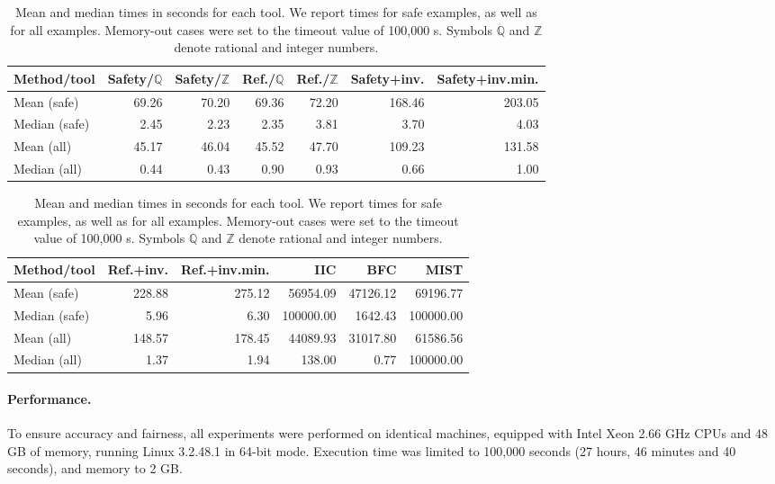 \begin{table}[t]
  \centering
  \caption[Mean and median times in seconds for each tool.]
  {Mean and median times in seconds for each tool. We report
  times for safe examples, as well as for all examples. Memory-out cases were
  set to the timeout value of 100,000 s. Symbols
  $\mathbb{Q}$ and $\mathbb{Z}$ denote rational and integer numbers.}
\label{table:mean-median-times}
  \begin{tabular}{lrrrrrr}
    \toprule
    Method/tool & Safety/$\mathbb{Q}$ & Safety/$\mathbb{Z}$ & Ref./$\mathbb{Q}$ &
    Ref./$\mathbb{Z}$ & Safety+inv. & Safety+inv.min. \\
    \midrule
    Mean (safe)   & 69.26 & 70.20 & 69.36 & 72.20 & 168.46 & 203.05 \\
    Median (safe) & 2.45 & 2.23 & 2.35 & 3.81 & 3.70 & 4.03 \\
    \midrule
    Mean (all)    & 45.17 & 46.04 & 45.52 & 47.70 & 109.23 & 131.58 \\
    Median (all)  & 0.44 & 0.43 & 0.90 & 0.93 & 0.66 & 1.00 \\
    \bottomrule
  \end{tabular}

  \vspace{1ex}

  \begin{tabular}{lrrrrr}
    \toprule
    Method/tool &
    Ref.+inv. & Ref.+inv.min. & IIC & BFC & MIST \\
    \midrule
    Mean (safe)   & 228.88 & 275.12 & 56954.09 & 47126.12 & 69196.77 \\
    Median (safe) & 5.96 & 6.30 & 100000.00 & 1642.43 & 100000.00 \\
    \midrule
    Mean (all)    & 148.57 & 178.45 & 44089.93 & 31017.80 & 61586.56 \\
    Median (all)  & 1.37 & 1.94 & 138.00 & 0.77 & 100000.00 \\
    \bottomrule
  \end{tabular}
\end{table}

\paragraph{Performance.} %
To ensure accuracy and fairness, all experiments were
performed on identical machines, equipped with Intel Xeon 2.66 GHz CPUs and 48 GB of memory, running Linux 3.2.48.1
in 64-bit mode. Execution time was limited to 100,000 seconds (27
hours, 46 minutes and 40 seconds), and memory to 2 GB\@.

